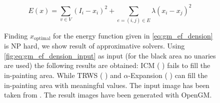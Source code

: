 \begin{equation} \label{eq:gm_ef_dension}
E(x) = \sum_{v \in V}  (I_i - x_i)^2 + \sum_{e=(i,j) \in E } \lambda (x_i-x_j)^2
\end{equation}

\begin{figure}[H]
    \centering
    \caption[Energy based truncated denoising]{
        Finding $x_{\text{optimal}} $ for the energy function given
        in \cref{eq:gm_ef_dension} is NP hard, we show result of approximative solvers.
        Using \cref{fig:eq:gm_ef_dension_input} as input (for the black area no unaries 
        are used)
        the following
        results are obtained:
        ICM
         \citep{besag_1986_icm}  ( ) fails
        to fill the in-painting area. 
        While TRWS
        \citep{kolmogorov_2006_pami_trws}  ( ) 
        and $\alpha$-Expansion
        \citep{boykov_2001_pami}  ( ) 
        can fill the in-painting area
        with meaningful values.
        The input image has been taken from \citep{szeliski_2008_pami}.
        The result images have been generated with OpenGM.
    }\label{fig:gm_ef_denoise}
\end{figure}

